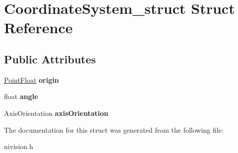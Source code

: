 \hypertarget{structCoordinateSystem__struct}{
\section{CoordinateSystem\_\-struct Struct Reference}
\label{structCoordinateSystem__struct}
}
\subsection*{Public Attributes}
\begin{DoxyCompactItemize}
\item 
\hypertarget{structCoordinateSystem__struct_a42519a5dfb0e6c73e3893e90e64e5367}{
\hyperlink{structPointFloat__struct}{PointFloat} {\bfseries origin}}
\label{structCoordinateSystem__struct_a42519a5dfb0e6c73e3893e90e64e5367}

\item 
\hypertarget{structCoordinateSystem__struct_a9e32cbefe79fe2ad057bac9812ce0f59}{
float {\bfseries angle}}
\label{structCoordinateSystem__struct_a9e32cbefe79fe2ad057bac9812ce0f59}

\item 
\hypertarget{structCoordinateSystem__struct_ae77bb01a0f51a14daed0c254c18cee43}{
AxisOrientation {\bfseries axisOrientation}}
\label{structCoordinateSystem__struct_ae77bb01a0f51a14daed0c254c18cee43}

\end{DoxyCompactItemize}


The documentation for this struct was generated from the following file:\begin{DoxyCompactItemize}
\item 
nivision.h\end{DoxyCompactItemize}
